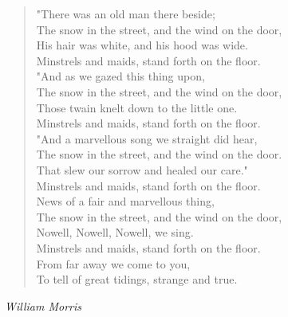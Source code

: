 \begin{verse}
"There was an old man there beside;\\
\hspace*{2em}The snow in the street, and the wind on the door,\\
His hair was white, and his hood was wide.\\
\hspace*{2em}Minstrels and maids, stand forth on the floor.\\[0.7em]

"And as we gazed this thing upon,\\
\hspace*{2em}The snow in the street, and the wind on the door,\\
Those twain knelt down to the little one.\\
\hspace*{2em}Minstrels and maids, stand forth on the floor.\\[0.7em]

"And a marvellous song we straight did hear,\\
\hspace*{2em}The snow in the street, and the wind on the door.\\
That slew our sorrow and healed our care."\\
\hspace*{2em}Minstrels and maids, stand forth on the floor.\\[0.7em]

News of a fair and marvellous thing,\\
\hspace*{2em}The snow in the street, and the wind on the door,\\
Nowell, Nowell, Nowell, we sing.\\
\hspace*{2em}Minstrels and maids, stand forth on the floor.\\
\hspace*{4em}From far away we come to you,\\
\hspace*{4em}To tell of great tidings, strange and true.%
\end{verse}

\vspace{0.5\baselineskip}
\noindent\textit{William Morris}

\newpage
